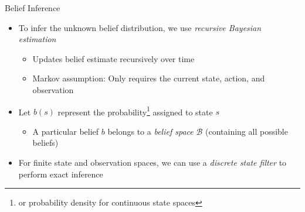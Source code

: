 \begin{frame}[fragile]{Belief Inference}

\begin{itemize}
    \item To infer the unknown belief distribution, we use \textit{recursive Bayesian estimation}
    \begin{itemize}
        \item Updates belief estimate recursively over time
        \item Markov assumption: Only requires the current state, action, and observation
    \end{itemize}
    \item Let $b(s)$ represent the probability\footnote{or probability density for continuous state spaces} assigned to state $s$
    \begin{itemize}
        \item A particular belief $b$ belongs to a \textit{belief space} $\mathcal{B}$ (containing all possible beliefs)
    \end{itemize}
    \item For finite state and observation spaces, we can use a \textit{discrete state filter} to perform exact inference
\end{itemize}


\end{frame}